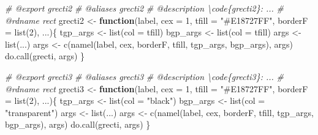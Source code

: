 \documentclass[
]{article}
\newenvironment{Shaded}{\begin{snugshade}}{\end{snugshade}}
\newcommand{\AttributeTok}[1]{\textcolor[rgb]{0.77,0.63,0.00}{#1}}
\newcommand{\CommentTok}[1]{\textcolor[rgb]{0.56,0.35,0.01}{\textit{#1}}}
\newcommand{\ControlFlowTok}[1]{\textcolor[rgb]{0.13,0.29,0.53}{\textbf{#1}}}
\newcommand{\DecValTok}[1]{\textcolor[rgb]{0.00,0.00,0.81}{#1}}
\newcommand{\FunctionTok}[1]{\textcolor[rgb]{0.00,0.00,0.00}{#1}}
\newcommand{\NormalTok}[1]{#1}
\newcommand{\OtherTok}[1]{\textcolor[rgb]{0.56,0.35,0.01}{#1}}
\newcommand{\StringTok}[1]{\textcolor[rgb]{0.31,0.60,0.02}{#1}}
\begin{document}
\begin{Shaded}
\begin{Highlighting}[]
\CommentTok{\#\textquotesingle{} @export grecti2}
\CommentTok{\#\textquotesingle{} @aliases grecti2}
\CommentTok{\#\textquotesingle{} @description \textbackslash{}code\{grecti2\}: ...}
\CommentTok{\#\textquotesingle{} @rdname rect}
\NormalTok{grecti2 }\OtherTok{\textless{}{-}} \ControlFlowTok{function}\NormalTok{(label, }\AttributeTok{cex =} \DecValTok{1}\NormalTok{, }\AttributeTok{tfill =} \StringTok{"\#E18727FF"}\NormalTok{,}
  \AttributeTok{borderF =} \FunctionTok{list}\NormalTok{(}\DecValTok{2}\NormalTok{), ...)\{}
\NormalTok{  tgp\_args }\OtherTok{\textless{}{-}} \FunctionTok{list}\NormalTok{(}\AttributeTok{col =}\NormalTok{ tfill)}
\NormalTok{  bgp\_args }\OtherTok{\textless{}{-}} \FunctionTok{list}\NormalTok{(}\AttributeTok{col =}\NormalTok{ tfill)}
\NormalTok{  args }\OtherTok{\textless{}{-}} \FunctionTok{list}\NormalTok{(...)}
\NormalTok{  args }\OtherTok{\textless{}{-}} \FunctionTok{c}\NormalTok{(}\FunctionTok{namel}\NormalTok{(label, cex, borderF, tfill, tgp\_args, bgp\_args), args)}
  \FunctionTok{do.call}\NormalTok{(grecti, args)}
\NormalTok{\}}

\CommentTok{\#\textquotesingle{} @export grecti3}
\CommentTok{\#\textquotesingle{} @aliases grecti3}
\CommentTok{\#\textquotesingle{} @description \textbackslash{}code\{grecti3\}: ...}
\CommentTok{\#\textquotesingle{} @rdname rect}
\NormalTok{grecti3 }\OtherTok{\textless{}{-}} \ControlFlowTok{function}\NormalTok{(label, }\AttributeTok{cex =} \DecValTok{1}\NormalTok{, }\AttributeTok{tfill =} \StringTok{"\#E18727FF"}\NormalTok{,}
  \AttributeTok{borderF =} \FunctionTok{list}\NormalTok{(}\DecValTok{2}\NormalTok{), ...)\{}
\NormalTok{  tgp\_args }\OtherTok{\textless{}{-}} \FunctionTok{list}\NormalTok{(}\AttributeTok{col =} \StringTok{"black"}\NormalTok{)}
\NormalTok{  bgp\_args }\OtherTok{\textless{}{-}} \FunctionTok{list}\NormalTok{(}\AttributeTok{col =} \StringTok{"transparent"}\NormalTok{)}
\NormalTok{  args }\OtherTok{\textless{}{-}} \FunctionTok{list}\NormalTok{(...)}
\NormalTok{  args }\OtherTok{\textless{}{-}} \FunctionTok{c}\NormalTok{(}\FunctionTok{namel}\NormalTok{(label, cex, borderF, tfill, tgp\_args, bgp\_args), args)}
  \FunctionTok{do.call}\NormalTok{(grecti, args)}
\NormalTok{\}}


\end{Highlighting}
\end{Shaded}
\end{document}
